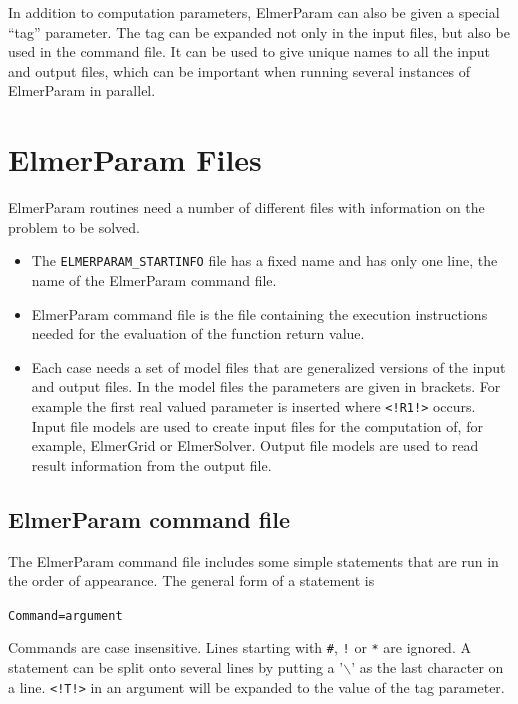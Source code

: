 \documentclass[12pt,a4paper]{article}
\newcommand{\ttbegin}{\begin{alltt}}
\newcommand{\ttend}{\end{alltt}}
\newcommand{\keno}{$\backslash$}
\newcommand{\code}[1]{\texttt{#1}}
\begin{document}
In addition to computation parameters, ElmerParam can also be given a
special ``tag'' parameter. The tag can be expanded not only in the input
files, but also be used in the command file.  It can be used to give unique
names to all the input and output files, which can be important when
running several instances of ElmerParam in parallel.

\section{ElmerParam Files}

ElmerParam routines need a number of different files with information on
the problem to be solved.

\begin{itemize}
\item The \texttt{ELMERPARAM\_STARTINFO} file has a fixed 
	name and has only one line, the name of the ElmerParam command file.
\item ElmerParam command file is the file containing the execution instructions 
	needed for the evaluation of the function return value. 
\item Each case needs a set of model files that are generalized versions of
    the input and output files.  In the model files the parameters are
    given in brackets.  For example the first real valued parameter is
    inserted where \code{<!R1!>} occurs.  Input file models are used to create
    input files for the computation of, for example, ElmerGrid or
    ElmerSolver.  Output file models are used to read result information
    from the output file. 
\end{itemize}


\subsection{ElmerParam command file}

The ElmerParam command file includes some simple statements that are run in
the order of appearance. The general form of a statement is
\ttbegin
Command = argument
\ttend
Commands are case insensitive. Lines starting with \code{\#}, \code{!} or
\code{*} are ignored. A statement can be split onto several lines by
putting a '\keno' as the last character on a line.  \code{<!T!>} in an
argument will be expanded to the value of the tag parameter.
\end{document}
